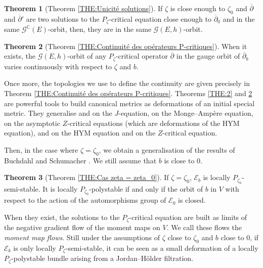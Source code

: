 \documentclass{article}
\theoremstyle{remark}
\theoremstyle{definition}
\newtheorem{theoremIntro}{Theorem}
\newcommand{\C}{\mathbb{C}}
\newcommand{\E}{\mathcal{E}}
\newcommand{\G}{\mathcal{G}}
\newcommand{\dbar}{\overline{\partial}}
\begin{document}
\begin{theoremIntro}[Theorem \ref{THE:Unicité solutions}]\label{THE:3}
    If $\zeta$ is close enough to $\zeta_0$ and $\dbar$ and $\dbar'$ are two solutions to the $P_\zeta$-critical equation close enough to $\dbar_0$ and in the same $\G^\C(E)$-orbit, then, they are in the same $\G(E,h)$-orbit.
\end{theoremIntro}

\begin{theoremIntro}[Theorem \ref{THE:Continuité des opérateurs P-critiques}]\label{THE:4}
    When it exists, the $\G(E,h)$-orbit of any $P_\zeta$-critical operator $\dbar$ in the gauge orbit of $\dbar_b$ varies continuously with respect to $\zeta$ and $b$.
\end{theoremIntro}

Once more, the topologies we use to define the continuity are given precisely in Theorem \ref{THE:Continuité des opérateurs P-critiques}. Theorems \ref{THE:2} and \ref{THE:4} are powerful tools to build canonical metrics as deformations of an initial special metric. They generalise \cite[Theorem 1.4]{Takahashi} and \cite[Theorem 1.6]{Takahashi} on the $J$-equation, \cite[Theorem 4.1]{Pingali} on the Monge--Ampère equation, \cite[Theorem 1.1]{DMS} on the asymptotic $Z$-critical equations (which are deformations of the HYM equation), \cite[Theorem 1.2]{Clarke_Tipler} and \cite[Theorem 3]{Delloque_2024} on the HYM equation and \cite[Proposition 3.16]{Keller_Scarpa} on the $Z$-critical equation.

Then, in the case where $\zeta = \zeta_0$, we obtain a generalisation of the results of Buchdahl and Schumacher \cite{Buchdahl_Schumacher}. We still assume that $b$ is close to $0$.

\begin{theoremIntro}[Theorem \ref{THE:Cas zeta = zeta_0}]\label{THE:5}
    If $\zeta = \zeta_0$, $\E_b$ is locally $P_{\zeta_0}$-semi-stable. It is locally $P_{\zeta_0}$-polystable if and only if the orbit of $b$ in $V$ with respect to the action of the automorphisms group of $\E_0$ is closed.
\end{theoremIntro}

When they exist, the solutions to the $P_\zeta$-critical equation are built as limits of the negative gradient flow of the moment maps on $V$. We call these flows the \textit{moment map flows}. Still under the assumptions of $\zeta$ close to $\zeta_0$ and $b$ close to $0$, if $\E_b$ is only locally $P_\zeta$-semi-stable, it can be seen as a small deformation of a locally $P_\zeta$-polystable bundle arising from a Jordan--Hölder filtration.
\end{document}
